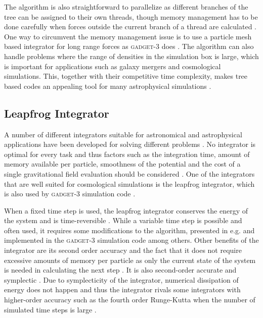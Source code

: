 \documentclass[english, oneside]{HYgradu}
\begin{document}
The algorithm is also straightforward to parallelize as different branches of the tree can be assigned to their own threads, though memory management has to be done carefully when forces outside the current branch of a thread are calculated \citep{binney2008galactic}. One way to circumvent the memory management issue is to use a particle mesh based integrator for long range forces as \textsc{gadget-3} does \citep{springel2005cosmological}. The algorithm can also handle problems where the range of densities in the simulation box is large, which is important for applications such as galaxy mergers and cosmological simulations. This, together with their competitive time complexity, makes tree based codes an appealing tool for many astrophysical simulations \citep{binney2008galactic}.


\subsection{Leapfrog Integrator} \label{sect:leapfrog}
A number of different integrators suitable for astronomical and astrophysical applications have been developed  for solving different problems \citep{binney2008galactic}. No integrator is optimal for every task and thus factors such as the integration time, amount of memory available per particle, smoothness of the potential and the cost of a single gravitational field evaluation should be considered \citep{binney2008galactic}. One of the integrators that are well suited for cosmological simulations is the leapfrog integrator, which is also used by \textsc{gadget-3} simulation code \citep{springel2005cosmological}.

When a fixed time step is used, the leapfrog integrator conserves the energy of the system and is time-reversible \citep{binney2008galactic}. While a variable time step is possible and often used, it requires some modifications to the algorithm, presented in e.g. \citet{springel2005cosmological} and implemented in the \textsc{gadget-3} simulation code among others. Other benefits of the integrator are its second order accuracy and the fact that it does not require excessive amounts of memory per particle as only the current state of the system is needed in calculating the next step \citep{binney2008galactic}. It is also second-order accurate and symplectic \citep{binney2008galactic}. Due to symplecticity of the integrator, numerical dissipation of energy does not happen and thus the integrator rivals some integrators with higher-order accuracy such as the fourth order Runge-Kutta when the number of simulated time steps is large \citep{binney2008galactic}.
\end{document}
